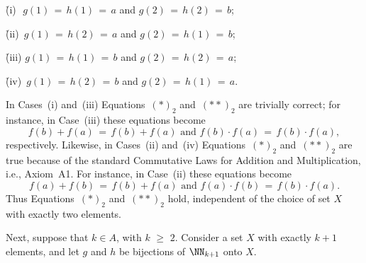 {        \h (i)\,\, $g(1) \,=\, h(1) \,=\, a$ and $g(2) \,=\, h(2) \,=\, b$;

        \h (ii)\,  $g(1) \,=\, h(2) \,=\, a$ and $g(2) \,=\, h(1) \,=\, b$;

        \h (iii)   $g(1) \,=\, h(1) \,=\, b$ and $g(2) \,=\, h(2) \,=\, a$;

        \h (iv)\,  $g(1) \,=\, h(2) \,=\, b$ and $g(2) \,=\, h(1) \,=\, a$.

\noindent In Cases~(i) and~(iii) Equations~$({\ast})_{2}$ and~$({\ast}{\ast})_{2}$ are trivially correct;
   for instance, in Case~(iii) these equations become
        \begin{displaymath}
        f(b) + f(a) \,=\, f(b) + f(a) \mbox{ and } f(b) {\cdot} f(a) \,=\, f(b) {\cdot} f(a),
        \end{displaymath}
    respectively.
    Likewise, in Cases~(ii) and~(iv) Equations~$({\ast})_{2}$ and~$({\ast}{\ast})_{2}$ are true because of the standard Commutative Laws for Addition and Multiplication, i.e., Axiom~A1.
    For instance, in Case~(ii) these equations become
        \begin{displaymath}
        f(a) + f(b) \,=\, f(b) + f(a) \mbox{ and } f(a) {\cdot} f(b) \,=\, f(b) {\cdot} f(a).
        \end{displaymath}
    Thus Equations~$({\ast})_{2}$ and~$({\ast}{\ast})_{2}$ hold, independent of the choice of set $X$ with exactly two elements.


        Next, suppose that $k{\in}A$, with $k\,\,{\geq}\,\,2$.
    Consider a set $X$ with exactly $k+1$ elements, and let $g$ and $h$ be bijections of ${\NN}_{k+1}$ onto $X$.


}

